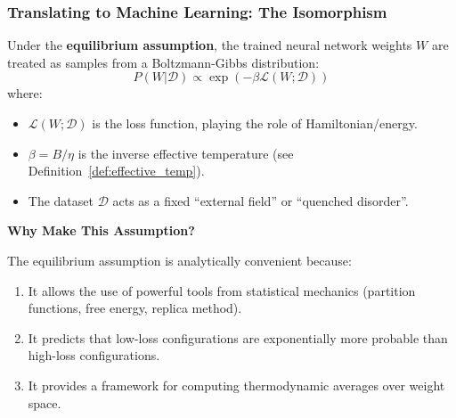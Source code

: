 \documentclass[
  journal=largetwo,
  simfonts=false,
  year=2025,
  volume=37,
]{cup-journal}
\begin{document}
\subsubsection{Translating to Machine Learning: The Isomorphism}

\begin{definition}\label{def:ml_equilibrium}
Under the \textbf{equilibrium assumption}, the trained neural network weights $W$ are treated as samples from a Boltzmann-Gibbs distribution:
\begin{equation}\label{eq:ml_gibbs}
    P(W | \mathcal{D}) \propto \exp\left( -\beta \mathcal{L}(W; \mathcal{D}) \right)
\end{equation}
where:
\begin{itemize}
    \item $\mathcal{L}(W; \mathcal{D})$ is the loss function, playing the role of Hamiltonian/energy.
    \item $\beta = B/\eta$ is the inverse effective temperature (see Definition~\ref{def:effective_temp}).
    \item The dataset $\mathcal{D}$ acts as a fixed ``external field'' or ``quenched disorder''.
\end{itemize}
\end{definition}

\textbf{Why Make This Assumption?}

The equilibrium assumption is analytically convenient because:
\begin{enumerate}
    \item It allows the use of powerful tools from statistical mechanics (partition functions, free energy, replica method).
    \item It predicts that low-loss configurations are exponentially more probable than high-loss configurations.
    \item It provides a framework for computing thermodynamic averages over weight space.
\end{enumerate}
\end{document}
